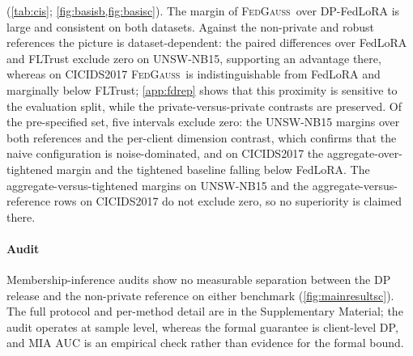 \documentclass[a4paper,fleqn]{cas-dc}
\newcommand{\method}{\textsc{FedGauss}}
\begin{document}
(\cref{tab:cis}; \cref{fig:basisb,fig:basisc}). The margin of \method\ over
DP-FedLoRA is large and consistent on both datasets. Against the non-private
and robust references the picture is dataset-dependent: the paired
differences over FedLoRA and FLTrust exclude zero on UNSW-NB15, supporting an
advantage there, whereas on CICIDS2017 \method\ is indistinguishable from
FedLoRA and marginally below FLTrust; \cref{app:fdrep} shows that this
proximity is sensitive to the evaluation split, while the private-versus-private
contrasts are preserved. Of the pre-specified set, five intervals exclude
zero: the UNSW-NB15 margins over both references and the per-client dimension
contrast, which confirms that the naive configuration is noise-dominated, and
on CICIDS2017 the aggregate-over-tightened margin and the tightened baseline
falling below FedLoRA. The aggregate-versus-tightened margins on UNSW-NB15
and the aggregate-versus-reference rows on CICIDS2017 do not exclude zero, so
no superiority is claimed there.
\par
\paragraph{Audit} Membership-inference audits show no measurable separation
between the DP release and the non-private reference on either benchmark
(\cref{fig:mainresultsc}). The full protocol and per-method detail are in
the Supplementary Material; the audit operates at sample level, whereas the
formal guarantee is client-level DP, and MIA AUC is an empirical check rather
than evidence for the formal bound.
\par
\end{document}
